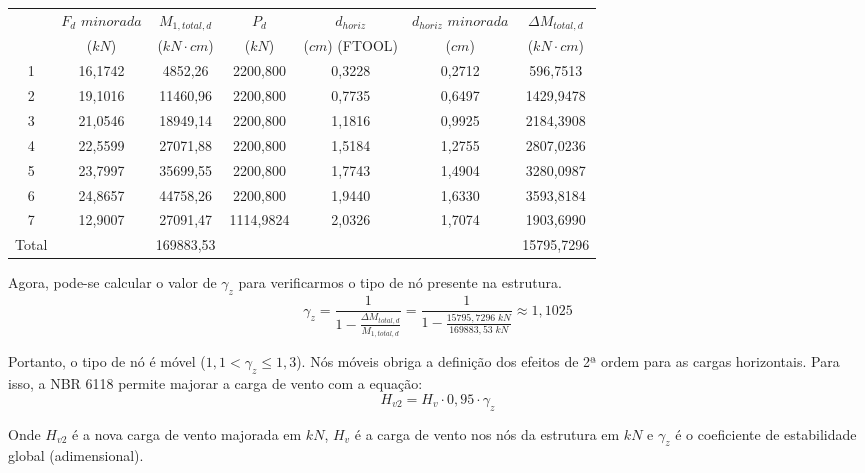 \begin{table}[H]
\centering
\begin{tabular}{c|c|c|ccc|c}
\hline
 & $F_d$ $minorada$ & $M_{1, total, d}$ & \multicolumn{1}{c|}{$P_d$} & \multicolumn{1}{c|}{$d_{horiz}$} & $d_{horiz}$ $minorada$ & $\Delta M_{total, d}$ \\
 & ($kN$) & ($kN\cdot cm$) & \multicolumn{1}{c|}{($kN$)} & \multicolumn{1}{c|}{($cm$) (FTOOL)} & ($cm$) & ($kN\cdot cm$) \\ \hline
1 & 16,1742 & 4852,26 & \multicolumn{1}{c|}{2200,800} & \multicolumn{1}{c|}{0,3228} & 0,2712 & 596,7513 \\
2 & 19,1016 & 11460,96 & \multicolumn{1}{c|}{2200,800} & \multicolumn{1}{c|}{0,7735} & 0,6497 & 1429,9478 \\
3 & 21,0546 & 18949,14 & \multicolumn{1}{c|}{2200,800} & \multicolumn{1}{c|}{1,1816} & 0,9925 & 2184,3908 \\
4 & 22,5599 & 27071,88 & \multicolumn{1}{c|}{2200,800} & \multicolumn{1}{c|}{1,5184} & 1,2755 & 2807,0236 \\
5 & 23,7997 & 35699,55 & \multicolumn{1}{c|}{2200,800} & \multicolumn{1}{c|}{1,7743} & 1,4904 & 3280,0987 \\
6 & 24,8657 & 44758,26 & \multicolumn{1}{c|}{2200,800} & \multicolumn{1}{c|}{1,9440} & 1,6330 & 3593,8184 \\
7 & 12,9007 & 27091,47 & \multicolumn{1}{c|}{1114,9824} & \multicolumn{1}{c|}{2,0326} & 1,7074 & 1903,6990 \\ \hline
Total &  & 169883,53 &  &  &  & 15795,7296 \\ \cline{1-1} \cline{3-3} \cline{7-7} 
\end{tabular}
\end{table}

Agora, pode-se calcular o valor de $\gamma_z$ para verificarmos o tipo de nó presente na estrutura.
$$\gamma_z=\frac{1}{1-\frac{\Delta M_{total, d}}{M_{1, total, d}}}=\frac{1}{1-\frac{15795,7296\;kN}{169883,53\;kN}}\approx1,1025$$

Portanto, o tipo de nó é móvel ($1,1<\gamma_z\leqslant1,3$). Nós móveis obriga a definição dos efeitos de 2ª ordem para as cargas horizontais. Para isso, a NBR 6118 permite majorar a carga de vento com a equação:
\begin{equation}H_{v2}=H_v\cdot0,95\cdot\gamma_z\end{equation}

Onde $H_{v2}$ é a nova carga de vento majorada em $kN$, $H_v$ é a carga de vento nos nós da estrutura em $kN$ e $\gamma_z$ é o coeficiente de estabilidade global (adimensional).

